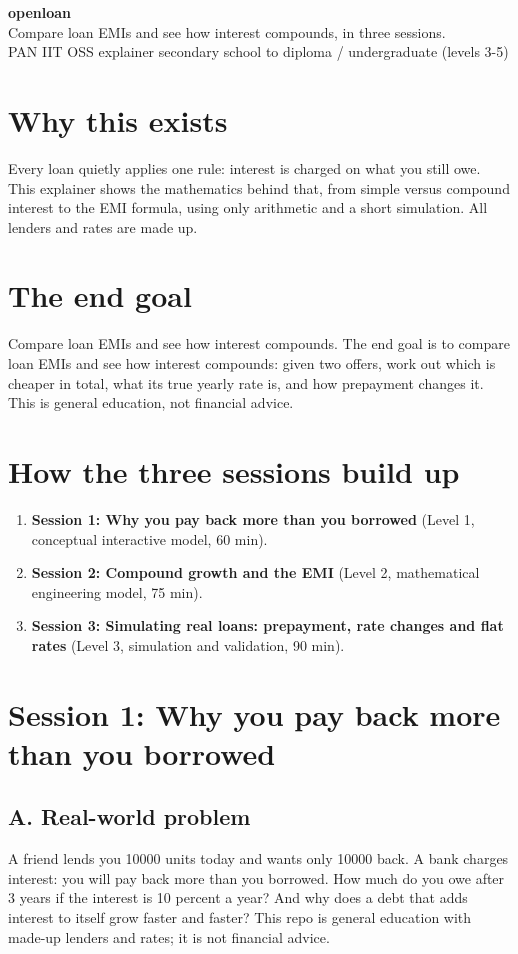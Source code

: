 \documentclass[11pt,a4paper]{article}
\begin{document}
\begin{center}{\LARGE\bfseries openloan}\\[0.4em]{\large Compare loan EMIs and see how interest compounds, in three sessions.}\\[0.2em]\small PAN IIT OSS explainer \textbullet{} secondary school to diploma / undergraduate (levels 3-5)\end{center}

\section*{Why this exists}
Every loan quietly applies one rule: interest is charged on what you still owe. This explainer shows the mathematics behind that, from simple versus compound interest to the EMI formula, using only arithmetic and a short simulation. All lenders and rates are made up.

\section*{The end goal}
Compare loan EMIs and see how interest compounds. The end goal is to compare loan EMIs and see how interest compounds: given two offers, work out which is cheaper in total, what its true yearly rate is, and how prepayment changes it. This is general education, not financial advice.

\section*{How the three sessions build up}
\begin{enumerate}[nosep]
\item \textbf{Session 1: Why you pay back more than you borrowed} (Level 1, conceptual interactive model, 60 min).
\item \textbf{Session 2: Compound growth and the EMI} (Level 2, mathematical engineering model, 75 min).
\item \textbf{Session 3: Simulating real loans: prepayment, rate changes and flat rates} (Level 3, simulation and validation, 90 min).
\end{enumerate}

\section{Session 1: Why you pay back more than you borrowed}

\subsection*{A. Real-world problem}
A friend lends you 10000 units today and wants only 10000 back. A bank charges interest: you will pay back more than you borrowed. How much do you owe after 3 years if the interest is 10 percent a year? And why does a debt that adds interest to itself grow faster and faster? This repo is general education with made-up lenders and rates; it is not financial advice.
\end{document}
